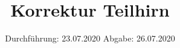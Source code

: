 

\subject{TPS Praktikum}
\title{Korrektur Teilhirn}
\date{%
  Durchführung: 23.07.2020
  \hspace{3em}
  Abgabe: 26.07.2020
}



\maketitle
\thispagestyle{empty}
\tableofcontents
\newpage






\newpage

\printbibliography{}
\nocite{*}


